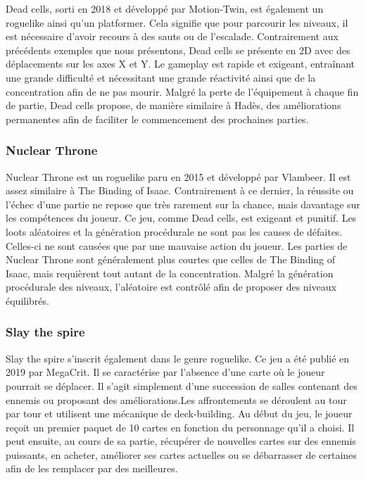 \documentclass[12pt,a4paper]{article}
\begin{document}
Dead cells, sorti en 2018 et développé par Motion-Twin, est également un roguelike ainsi qu'un platformer. Cela signifie que pour parcourir les niveaux, il est nécessaire d'avoir recours à des sauts ou de l'escalade. Contrairement aux précédents exemples que nous présentons, Dead cells se présente en 2D avec des déplacements sur les axes X et Y. Le gameplay est rapide et exigeant, entraînant une grande difficulté et nécessitant une grande réactivité ainsi que de la concentration afin de ne pas mourir. Malgré la perte de l'équipement à chaque fin de partie, Dead cells propose, de manière similaire à Hadès, des améliorations permanentes afin de faciliter le commencement des prochaines parties. 
\\

\vspace*{.2mm}
\normalsize{\subsubsection{Nuclear Throne}}
Nuclear Throne est un roguelike paru en 2015 et développé par Vlambeer. Il est assez similaire à The Binding of Isaac. Contrairement à ce dernier, la réussite ou l'échec d'une partie ne repose que très rarement sur la chance, mais davantage sur les compétences du joueur. Ce jeu, comme Dead cells, est exigeant et punitif. Les loots aléatoires et la génération procédurale ne sont pas les causes de défaites. Celles-ci ne sont causées que par une mauvaise action du joueur. Les parties de Nuclear Throne sont généralement plus courtes que celles de The Binding of Isaac, mais requièrent tout autant de la concentration. Malgré la génération procédurale des niveaux, l'aléatoire est contrôlé afin de proposer des niveaux équilibrés. 
\\
\vspace*{.2mm}
\normalsize{\subsubsection{Slay the spire }}
Slay the spire s'inscrit également dans le genre roguelike. Ce jeu a été publié en 2019 par MegaCrit. Il se caractérise par l'absence d'une carte où le joueur pourrait se déplacer. Il s'agit simplement d'une succession de salles contenant des ennemis ou proposant des améliorations.Les affrontements se déroulent au tour par tour et utilisent une mécanique de deck-building. Au début du jeu, le joueur reçoit un premier paquet de 10 cartes en fonction du personnage qu'il a choisi. Il peut ensuite, au cours de sa partie, récupérer de nouvelles cartes sur des ennemis puissants, en acheter, améliorer ses cartes actuelles ou se débarrasser de certaines afin de les remplacer par des meilleures. 
\end{document}
